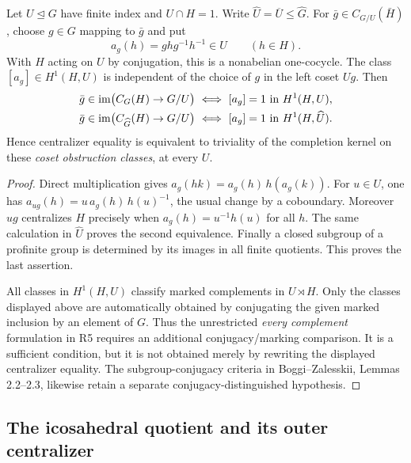 Let \(U\trianglelefteq G\) have finite index and \(U\cap H=1\). Write
\(\widehat U=\overline U\leq\widehat G\). For
\(\bar g\in C_{G/U}(\bar H)\), choose \(g\in G\) mapping to \(\bar g\) and put
\[
 a_g(h)=ghg^{-1}h^{-1}\in U\qquad(h\in H).
\]
With \(H\) acting on \(U\) by conjugation, this is a nonabelian
one-cocycle. The class \([a_g]\in H^1(H,U)\) is independent of the
choice of \(g\) in the left coset \(Ug\). Then
\[
\begin{split}
 \bar g\in\operatorname{im}\bigl(C_G(H)\to G/U\bigr)
 &\ \Longleftrightarrow\ [a_g]=1\text{ in }H^1(H,U),\\
 \bar g\in\operatorname{im}\bigl(C_{\widehat G}(H)\to G/U\bigr)
 &\ \Longleftrightarrow\ [a_g]=1\text{ in }H^1(H,\widehat U).
\end{split}
\]
Hence centralizer equality is equivalent to triviality of the completion
kernel on these \emph{coset obstruction classes}, at every \(U\).
\begin{proof}
Direct multiplication gives
\(a_g(hk)=a_g(h)\,h(a_g(k))\). For \(u\in U\), one has
\(a_{ug}(h)=u\,a_g(h)\,h(u)^{-1}\), the usual change by a coboundary.
Moreover \(ug\) centralizes \(H\) precisely when
\(a_g(h)=u^{-1}h(u)\) for all \(h\). The same calculation in
\(\widehat U\) proves the second equivalence. Finally a closed subgroup
of a profinite group is determined by its images in all finite
quotients. This proves the last assertion.

All classes in \(H^1(H,U)\) classify marked complements in \(U\rtimes H\).
Only the classes displayed above are automatically obtained by conjugating
the given marked inclusion by an element of \(G\). Thus the unrestricted
\emph{every complement} formulation in R5 requires an additional
conjugacy/marking comparison. It is a sufficient condition, but it is
not obtained merely by rewriting the displayed centralizer equality.
The subgroup-conjugacy criteria in Boggi--Zalesskii, Lemmas 2.2--2.3,
likewise retain a separate conjugacy-distinguished hypothesis.
\end{proof}

\subsection*{The icosahedral quotient and its outer centralizer}

